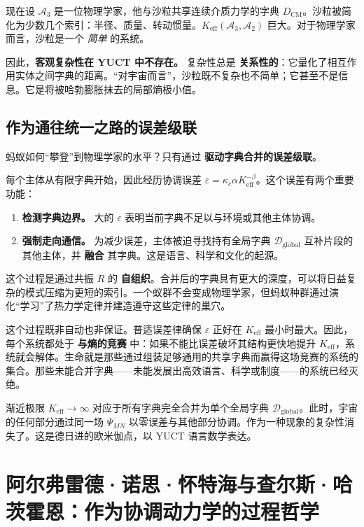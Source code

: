 \documentclass[12pt,a4paper]{article}
\newcommand{\Keff}{K_{\mathrm{eff}}}
\begin{document}
	现在设 \(\mathcal{A}_3\) 是一位物理学家，他与沙粒共享连续介质力学的字典 \(D_{\text{CM}}\)。沙粒被简化为少数几个索引：半径、质量、转动惯量。\(\Keff(\mathcal{A}_3, \mathcal{A}_2)\) 巨大。对于物理学家而言，沙粒是一个 \emph{简单} 的系统。
	
	因此，\textbf{客观复杂性在 YUCT 中不存在。} 复杂性总是 \textbf{关系性的}：它量化了相互作用实体之间字典的距离。“对宇宙而言”，沙粒既不复杂也不简单；它甚至不是信息。它是将被哈勃膨胀抹去的局部熵极小值。
	
	\subsection{作为通往统一之路的误差级联}
	\label{subsec:cascade}
	
	蚂蚁如何“攀登”到物理学家的水平？只有通过 \textbf{驱动字典合并的误差级联}。
	
	每个主体从有限字典开始，因此经历协调误差 \(\varepsilon = \kappa_c \alpha \Keff^{-\beta}\)。这个误差有两个重要功能：
	
	\begin{enumerate}[leftmargin=*]
		\item \textbf{检测字典边界。} 大的 \(\varepsilon\) 表明当前字典不足以与环境或其他主体协调。
		\item \textbf{强制走向通信。} 为减少误差，主体被迫寻找持有全局字典 \(\mathcal{D}_{\text{global}}\) 互补片段的其他主体，并 \textbf{融合} 其字典。这是语言、科学和文化的起源。
	\end{enumerate}
	
	这个过程是通过共振 \(R\) 的 \textbf{自组织}。合并后的字典具有更大的深度，可以将日益复杂的模式压缩为更短的索引。一个蚁群不会变成物理学家，但蚂蚁种群通过演化“学习”了热力学定律并建造遵守这些定律的巢穴。
	
	这个过程既非自动也非保证。普适误差律确保 \(\varepsilon\) 正好在 \(\Keff\) 最小时最大。因此，每个系统都处于 \textbf{与熵的竞赛} 中：如果不能比误差破坏其结构更快地提升 \(\Keff\)，系统就会解体。生命就是那些通过组装足够通用的共享字典而赢得这场竞赛的系统的集合。那些未能合并字典——未能发展出高效语言、科学或制度——的系统已经灭绝。
	
	渐近极限 \(\Keff \to \infty\) 对应于所有字典完全合并为单个全局字典 \(\mathcal{D}_{\text{global}}\)。此时，宇宙的任何部分通过同一场 \(\Psi_{MN}\) 以零误差与其他部分协调。作为一种现象的复杂性消失了。这是德日进的欧米伽点，以 YUCT 语言数学表达。
	
	\section{阿尔弗雷德·诺思·怀特海与查尔斯·哈茨霍恩：作为协调动力学的过程哲学}
	
\end{document}
